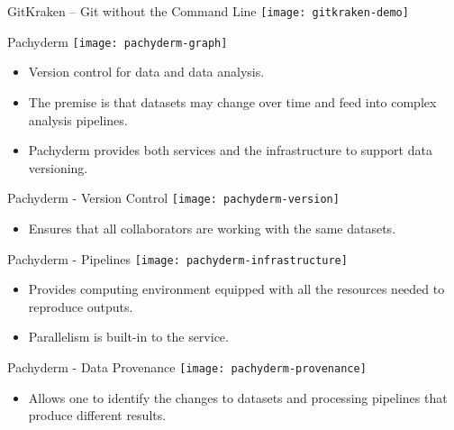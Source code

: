 \documentclass{beamer}
\begin{document}
\begin{frame}{GitKraken -- Git without the Command Line}
  \center
  \texttt{[image: gitkraken-demo]}
\end{frame}

\begin{frame}{Pachyderm}
  \center
  \texttt{[image: pachyderm-graph]}
  \begin{itemize}
    \item Version control for data and data analysis.

    \item The premise is that datasets may change over time and feed into complex analysis pipelines.

    \item Pachyderm provides both services and the infrastructure to support data versioning.
  \end{itemize}
\end{frame}

\begin{frame}{Pachyderm - Version Control}
  \center
  \texttt{[image: pachyderm-version]}
  \begin{itemize}
    \item Ensures that all collaborators are working with the same datasets.
  \end{itemize}
\end{frame}

\begin{frame}{Pachyderm - Pipelines}
  \center
  \texttt{[image: pachyderm-infrastructure]}
  \begin{itemize}
    \item Provides computing environment equipped with all the resources needed to reproduce outputs.

    \item Parallelism is built-in to the service.
  \end{itemize}
\end{frame}

\begin{frame}{Pachyderm - Data Provenance}
  \center
  \texttt{[image: pachyderm-provenance]}
  \begin{itemize}
    \item Allows one to identify the changes to datasets and processing pipelines that produce different results.
  \end{itemize}
\end{frame}
\end{document}
